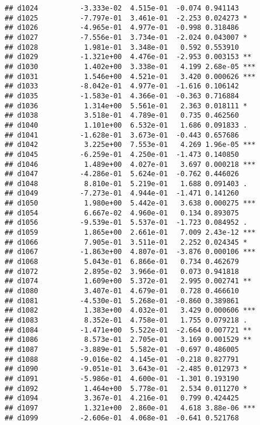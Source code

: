 \documentclass[
]{article}
\begin{document}
\begin{verbatim}
## d1024          -3.333e-02  4.515e-01  -0.074 0.941143    
## d1025          -7.797e-01  3.461e-01  -2.253 0.024273 *  
## d1026          -4.965e-01  4.977e-01  -0.998 0.318486    
## d1027          -7.556e-01  3.734e-01  -2.024 0.043007 *  
## d1028           1.981e-01  3.348e-01   0.592 0.553910    
## d1029          -1.321e+00  4.476e-01  -2.953 0.003153 ** 
## d1030           1.402e+00  3.338e-01   4.199 2.68e-05 ***
## d1031           1.546e+00  4.521e-01   3.420 0.000626 ***
## d1033          -8.042e-01  4.977e-01  -1.616 0.106142    
## d1035          -1.583e-01  4.366e-01  -0.363 0.716884    
## d1036           1.314e+00  5.561e-01   2.363 0.018111 *  
## d1038           3.518e-01  4.789e-01   0.735 0.462560    
## d1040           1.101e+00  6.532e-01   1.686 0.091833 .  
## d1041          -1.628e-01  3.673e-01  -0.443 0.657686    
## d1042           3.225e+00  7.553e-01   4.269 1.96e-05 ***
## d1045          -6.259e-01  4.250e-01  -1.473 0.140850    
## d1046           1.489e+00  4.027e-01   3.697 0.000218 ***
## d1047          -4.286e-01  5.624e-01  -0.762 0.446026    
## d1048           8.810e-01  5.219e-01   1.688 0.091403 .  
## d1049          -7.273e-01  4.944e-01  -1.471 0.141260    
## d1050           1.980e+00  5.442e-01   3.638 0.000275 ***
## d1054           6.667e-02  4.960e-01   0.134 0.893075    
## d1056          -9.539e-01  5.537e-01  -1.723 0.084952 .  
## d1059           1.865e+00  2.661e-01   7.009 2.43e-12 ***
## d1066           7.905e-01  3.511e-01   2.252 0.024345 *  
## d1067          -1.863e+00  4.807e-01  -3.876 0.000106 ***
## d1068           5.043e-01  6.866e-01   0.734 0.462679    
## d1072           2.895e-02  3.966e-01   0.073 0.941818    
## d1074           1.609e+00  5.372e-01   2.995 0.002741 ** 
## d1080           3.407e-01  4.679e-01   0.728 0.466610    
## d1081          -4.530e-01  5.268e-01  -0.860 0.389861    
## d1082           1.383e+00  4.032e-01   3.429 0.000606 ***
## d1083           8.352e-01  4.758e-01   1.755 0.079218 .  
## d1084          -1.471e+00  5.522e-01  -2.664 0.007721 ** 
## d1086           8.573e-01  2.705e-01   3.169 0.001529 ** 
## d1087          -3.889e-01  5.582e-01  -0.697 0.486005    
## d1088          -9.016e-02  4.145e-01  -0.218 0.827791    
## d1090          -9.051e-01  3.643e-01  -2.485 0.012973 *  
## d1091          -5.986e-01  4.600e-01  -1.301 0.193190    
## d1092           1.464e+00  5.778e-01   2.534 0.011270 *  
## d1094           3.367e-01  4.216e-01   0.799 0.424425    
## d1097           1.321e+00  2.860e-01   4.618 3.88e-06 ***
## d1099          -2.606e-01  4.068e-01  -0.641 0.521768    

\end{verbatim}
\end{document}
